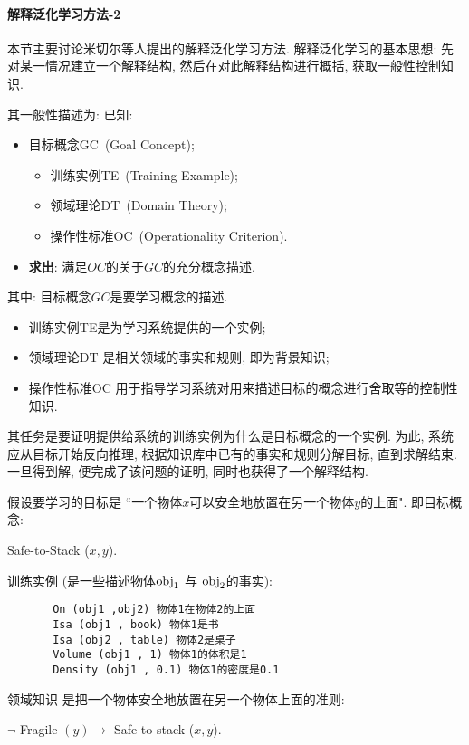 \paragraph{解释泛化学习方法-2}
本节主要讨论米切尔等人提出的解释泛化学习方法.
解释泛化学习的基本思想: 先对某一情况建立一个解释结构, 然后在对此解释结构进行概括, 获取一般性控制知识.

其一般性描述为: 已知:
\begin{itemize}
\item 目标概念GC\, (Goal Concept);
   \begin{itemize}
         \item 训练实例TE\, (Training Example);
         \item 领域理论DT\, (Domain Theory);
         \item 操作性标准OC\, (Operationality Criterion).
   \end{itemize}
\item \textbf{求出}: 满足$OC$的关于$GC$的充分概念描述.
\end{itemize}
其中: 目标概念$GC$是要学习概念的描述.

\begin{itemize}
    \item 训练实例TE是为学习系统提供的一个实例;
    \item 领域理论DT 是相关领域的事实和规则, 即为背景知识;
    \item 操作性标准OC 用于指导学习系统对用来描述目标的概念进行舍取等的控制性知识.
\end{itemize}

其任务是要证明提供给系统的训练实例为什么是目标概念的一个实例.
为此, 系统应从目标开始反向推理, 根据知识库中已有的事实和规则分解目标, 直到求解结束.
一旦得到解, 便完成了该问题的证明, 同时也获得了一个解释结构.

\begin{example}\label{AIC7exam7.14}
    假设要学习的目标是 ``一个物体$x$可以安全地放置在另一个物体$y$的上面". 即目标概念:
\begin{center}
    Safe-to-Stack ($x, y$).
\end{center}

训练实例 (是一些描述物体$\textup{obj}_1$ 与 $\textup{obj}_2$的事实):
\begin{Verbatim}
       On (obj1 ,obj2) 物体1在物体2的上面
       Isa (obj1 , book) 物体1是书
       Isa (obj2 , table) 物体2是桌子
       Volume (obj1 , 1) 物体1的体积是1
       Density (obj1 , 0.1) 物体1的密度是0.1
\end{Verbatim}

领域知识   是把一个物体安全地放置在另一个物体上面的准则:
\begin{center}
    $\neg $ Fragile $(y) \rightarrow$ Safe-to-stack ($x, y$).
\end{center}
\vspace{-0.4cm}
\end{example}

